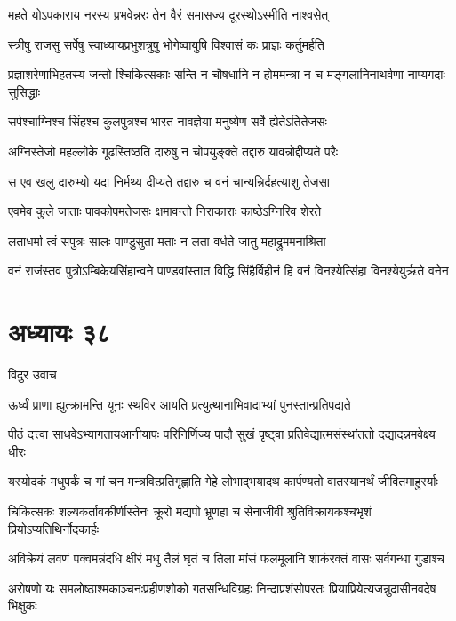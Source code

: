 \twolineshloka
{महते योऽपकाराय नरस्य प्रभवेन्नरः}
{तेन वैरं समासज्य दूरस्थोऽस्मीति नाश्वसेत्}


\twolineshloka
{स्त्रीषु राजसु सर्पेषु स्वाध्यायप्रभुशत्रुषु}
{भोगेष्वायुषि विश्वासं कः प्राज्ञः कर्तुमर्हति}


\twolineshloka
{प्रज्ञाशरेणाभिहतस्य जन्तो-श्चिकित्सकाः सन्ति न चौषधानि}
{न होममन्त्रा न च मङ्गलानिनाथर्वणा नाप्यगदाः सुसिद्धाः}


\twolineshloka
{सर्पश्चाग्निश्च सिंहश्च कुलपुत्रश्च भारत}
{नावज्ञेया मनुष्येण सर्वे ह्येतेऽतितेजसः}


\twolineshloka
{अग्निस्तेजो महल्लोके गूढस्तिष्ठति दारुषु}
{न चोपयुङ्क्ते तद्दारु यावन्नोद्दीप्यते परैः}


\twolineshloka
{स एव खलु दारुभ्यो यदा निर्मथ्य दीप्यते}
{तद्दारु च वनं चान्यन्निर्दहत्याशु तेजसा}


\twolineshloka
{एवमेव कुले जाताः पावकोपमतेजसः}
{क्षमावन्तो निराकाराः काष्ठेऽग्निरिव शेरते}


\twolineshloka
{लताधर्मा त्वं सपुत्रः सालः पाण्डुसुता मताः}
{न लता वर्धते जातु महाद्रुममनाश्रिता}


\twolineshloka
{वनं राजंस्तव पुत्रोऽम्बिकेयसिंहान्वने पाण्डवांस्तात विद्धि}
{सिंहैर्विहीनं हि वनं विनश्येत्सिंहा विनश्येयुर्ऋते वनेन}


\chapter{अध्यायः ३८}
\twolineshloka
{विदुर उवाच}
{}


\twolineshloka
{ऊर्ध्वं प्राणा ह्युत्क्रामन्ति यूनः स्थविर आयति}
{प्रत्युत्थानाभिवादाभ्यां पुनस्तान्प्रतिपद्यते}


\twolineshloka
{पीठं दत्त्वा साधवेऽभ्यागतायआनीयापः परिनिर्णिज्य पादौ}
{सुखं पृष्ट्वा प्रतिवेद्यात्मसंस्थांततो दद्यादन्नमवेक्ष्य धीरः}


\twolineshloka
{यस्योदकं मधुपर्कं च गां चन मन्त्रवित्प्रतिगृह्णाति गेहे}
{लोभाद्भयादथ कार्पण्यतो वातस्यानर्थं जीवितमाहुरर्याः}


\twolineshloka
{चिकित्सकः शल्यकर्तावकीर्णीस्तेनः क्रूरो मद्यपो भ्रूणहा च}
{सेनाजीवी श्रुतिविक्रायकश्चभृशं प्रियोऽप्यतिथिर्नोदकार्हः}


\twolineshloka
{अविक्रेयं लवणं पक्वमन्नंदधि क्षीरं मधु तैलं घृतं च}
{तिला मांसं फलमूलानि शाकंरक्तं वासः सर्वगन्धा गुडाश्च}


\twolineshloka
{अरोषणो यः समलोष्ठाश्मकाञ्चनःप्रहीणशोको गतसन्धिविग्रहः}
{निन्दाप्रशंसोपरतः प्रियाप्रियेत्यजन्नुदासीनवदेष भिक्षुकः}


